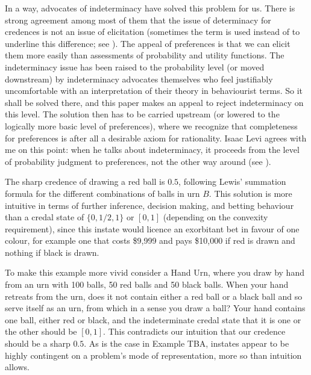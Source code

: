 \documentclass[11pt]{article}
\begin{document}
In a way, advocates of indeterminacy have solved this problem for us.
There is strong agreement among most of them that the issue of
determinacy for credences is not an issue of elicitation (sometimes
the term  is used instead of 
to underline this difference; see ). The appeal
of preferences is that we can elicit them more easily than assessments
of probability and utility functions. The indeterminacy issue has been
raised to the probability level (or moved downstream) by indeterminacy
advocates themselves who feel justifiably uncomfortable with an
interpretation of their theory in behaviourist terms. So it shall be
solved there, and this paper makes an appeal to reject indeterminacy
on this level. The solution then has to be carried upstream (or
lowered to the logically more basic level of preferences), where we
recognize that completeness for preferences is after all a desirable
axiom for rationality. Isaac Levi agrees with me on this point: when
he talks about indeterminacy, it proceeds from the level of
probability judgment to preferences, not the other way around (see
).


The sharp credence of drawing a red ball is $0.5$, following Lewis'
summation formula for the different combinations of balls in urn $B$.
This solution is more intuitive in terms of further inference,
decision making, and betting behaviour than a credal state of
$\{0,1/2,1\}$ or $[0,1]$ (depending on the convexity requirement),
since this instate would licence an exorbitant bet in favour of one
colour, for example one that costs \$9,999 and pays \$10,000 if red is
drawn and nothing if black is drawn.

To make this example more vivid consider a Hand Urn, where you draw by
hand from an urn with 100 balls, 50 red balls and 50 black balls. When
your hand retreats from the urn, does it not contain either a red ball
or a black ball and so serve itself as an urn, from which in a sense
you draw a ball? Your hand contains one ball, either red or black, and
the indeterminate credal state that it is one or the other should be
$[0,1]$. This contradicts our intuition that our credence should be a
sharp $0.5$. As is the case in Example TBA,
instates appear to be highly contingent on a problem's mode of
representation, more so than intuition allows.
\end{document}
